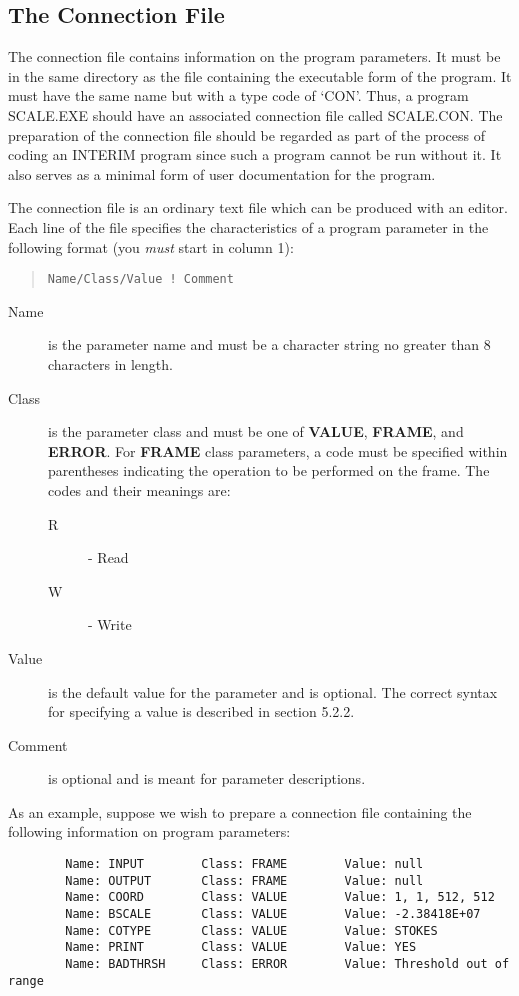 \subsection {The Connection File}
The connection file contains information on the program parameters.
It must be in the same directory as the file containing the executable
form of the program.
It must have the same name but with a type code of `CON'.
Thus, a program SCALE.EXE should have an associated connection file called
SCALE.CON.
The preparation of the connection file should be regarded as part of the
process of coding an INTERIM program since such a program cannot be run
without it.
It also serves as a minimal form of user documentation for the program.

The connection file is an ordinary text file which can be produced with an
editor.
Each line of the file specifies the characteristics of a program parameter
in the following format (you {\em must} start in column 1):
\begin{quote}
{\tt Name/Class/Value	! Comment}
\end{quote}
\begin{description}
\item [Name] is the parameter name and must be a character string no greater
than 8 characters in length.
\item [Class] is the parameter class and must be one of {\bf VALUE},
{\bf FRAME}, and {\bf ERROR}.
For {\bf FRAME} class parameters, a code must be specified within parentheses
indicating the operation to be performed on the frame.
The codes and their meanings are:
\begin{description}
\begin{description}
\item [R] - Read
\item [W] - Write
\end{description}
\end{description}
\item [Value] is the default value for the parameter and is optional.
The correct syntax for specifying a value is described in section 5.2.2.
\item [Comment] is optional and is meant for parameter descriptions.
\end{description}
As an example, suppose we wish to prepare a connection file containing the
following information on program parameters:
\begin{verbatim}
        Name: INPUT        Class: FRAME        Value: null
        Name: OUTPUT       Class: FRAME        Value: null
        Name: COORD        Class: VALUE        Value: 1, 1, 512, 512
        Name: BSCALE       Class: VALUE        Value: -2.38418E+07
        Name: COTYPE       Class: VALUE        Value: STOKES
        Name: PRINT        Class: VALUE        Value: YES
        Name: BADTHRSH     Class: ERROR        Value: Threshold out of range
\end{verbatim}
